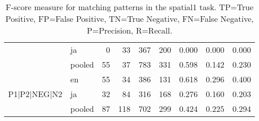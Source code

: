 \begin{table}[h!]
\begin{tabular}{llrrrrrrr}
 & ja & 0 & 33 & 367 & 200 & 0.000 & 0.000 & 0.000 \\
 & pooled & 55 & 37 & 783 & 331 & 0.598 & 0.142 & 0.230 \\
\cline{1-9}
\multirow[t]{3}{*}{P1|P2|NEG|N2} & en & 55 & 34 & 386 & 131 & 0.618 & 0.296 & 0.400 \\
 & ja & 32 & 84 & 316 & 168 & 0.276 & 0.160 & 0.203 \\
 & pooled & 87 & 118 & 702 & 299 & 0.424 & 0.225 & 0.294 \\
\cline{1-9}
\bottomrule
\end{tabular}
\caption{F-score measure for matching patterns in the spatial1 task. TP=True Positive, FP=False Positive, TN=True Negative, FN=False Negative, P=Precision, R=Recall.}
\label{tab:spatial1_f1}
\end{table}
